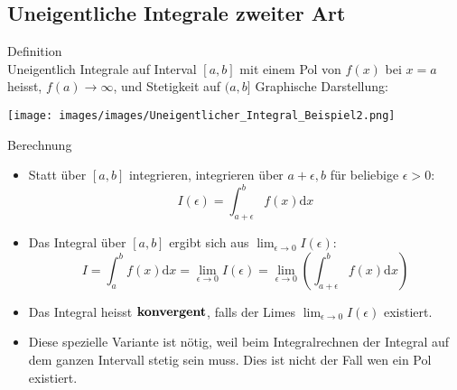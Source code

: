 \subsection{Uneigentliche Integrale zweiter Art}
	\begin{definition}{Definition}\\
		Uneigentlich Integrale auf Interval \([a,b]\) mit einem Pol von \(f(x)\) bei \(x=a\) heisst,
		\(f(a) \rightarrow \infty\), und Stetigkeit auf \((a,b]\)
		Graphische Darstellung:
	\begin{center}
		\texttt{[image: images/images/Uneigentlicher\_Integral\_Beispiel2.png]}
	\end{center}
  \end{definition}
  \begin{KR}{Berechnung}\\
	  \begin{itemize}
	  	
\item Statt über \([a,b]\) integrieren, integrieren über \(a+\epsilon,b\) für beliebige \(\epsilon>0\):
	\[I(\epsilon)=\int_{a+\epsilon}^b{f(x)\mathrm{d}x}\]
\item Das Integral über \([a,b]\) ergibt sich aus \(\lim_{\epsilon \rightarrow 0}I(\epsilon)\):
	\[I=\int_a^b{f(x)\mathrm{d}x}=\underset{\epsilon \rightarrow 0}{\lim}I(\epsilon)=\underset{\epsilon \rightarrow
	0}{\lim}\left(\int_{a+\epsilon}^b{f(x)\mathrm{d}x}\right) \]
\item Das Integral heisst \(\bold{konvergent}\), falls der Limes \(\lim_{\epsilon \rightarrow 0}I(\epsilon)\) existiert.
\item Diese spezielle Variante ist nötig, weil beim Integralrechnen der Integral auf dem ganzen Intervall stetig sein
	muss. Dies ist nicht der Fall wen ein Pol existiert.
\end{itemize}
  \end{KR}
